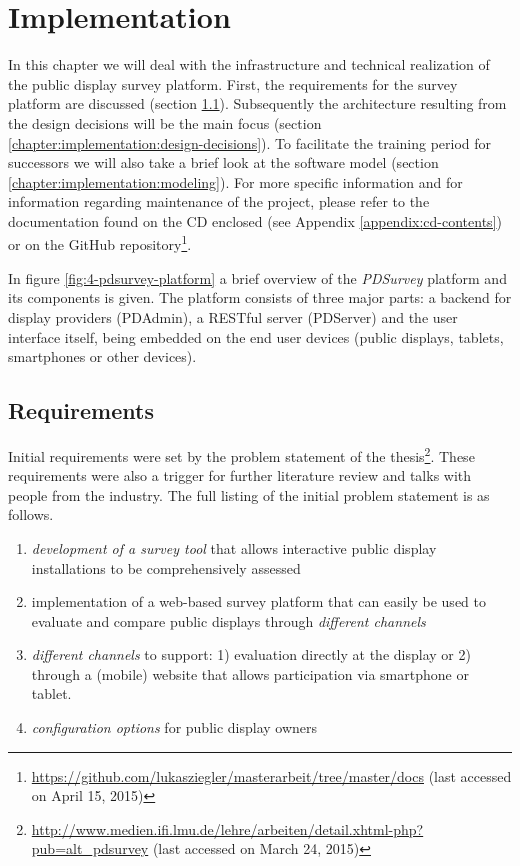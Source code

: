 \section{Implementation}
\label{chapter:implementation}

	In this chapter we will deal with the infrastructure and technical realization of the public display survey platform. First, the requirements for the survey platform are discussed (section \ref{chapter:implementation:requirements}). Subsequently the architecture resulting from the design decisions will be the main focus (section \ref{chapter:implementation:design-decisions}). To facilitate the training period for successors we will also take a brief look at the software model (section \ref{chapter:implementation:modeling}). For more specific information and for information regarding maintenance of the project, please refer to the documentation found on the CD enclosed (see Appendix \ref{appendix:cd-contents}) or on the GitHub repository\footnote{\url{https://github.com/lukasziegler/masterarbeit/tree/master/docs} (last accessed on April 15, 2015)}.

	In figure \ref{fig:4-pdsurvey-platform} a brief overview of the \textit{PDSurvey} platform and its components is given. The platform consists of three major parts: a backend for display providers (PDAdmin), a RESTful server (PDServer) and the user interface itself, being embedded on the end user devices (public displays, tablets, smartphones or other devices). 





\subsection{Requirements}
\label{chapter:implementation:requirements}

	Initial requirements were set by the problem statement of the thesis\footnote{\url{http://www.medien.ifi.lmu.de/lehre/arbeiten/detail.xhtml-php?pub=alt_pdsurvey} (last accessed on March 24, 2015)}. These requirements were also a trigger for further literature review and talks with people from the industry. The full listing of the initial problem statement is as follows.

	\begin{enumerate}[itemsep=0pt] 
	\item \textit{development of a survey tool} that allows interactive public display installations to be comprehensively assessed 
	\item implementation of a web-based survey platform that can easily be used to evaluate and compare public displays through \textit{different channels} 
	\item \textit{different channels} to support: 1) evaluation directly at
	the display or 2) through a (mobile) website that allows participation via smartphone or tablet.
	\item \textit{configuration options} for public display owners
	\end{enumerate}


